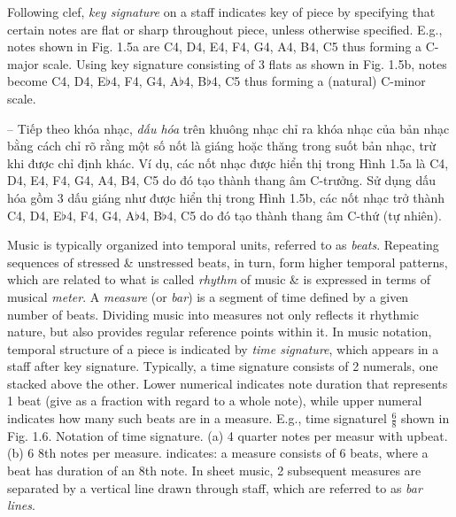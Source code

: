 \documentclass{article}
\begin{document}
\begin{itemize}
\begin{itemize}
\begin{itemize}
			Following clef, {\it key signature} on a staff indicates key of piece by specifying that certain notes are flat or sharp throughout piece, unless otherwise specified. E.g., notes shown in {\sf Fig. 1.5a} are C4, D4, E4, F4, G4, A4, B4, C5 thus forming a C-major scale. Using key signature consisting of 3 flats as shown in {\sf Fig. 1.5b}, notes become C4, D4, E$\flat$4, F4, G4, A$\flat$4, B$\flat$4, C5 thus forming a (natural) C-minor scale.
			
			-- Tiếp theo khóa nhạc, {\it dấu hóa} trên khuông nhạc chỉ ra khóa nhạc của bản nhạc bằng cách chỉ rõ rằng một số nốt là giáng hoặc thăng trong suốt bản nhạc, trừ khi được chỉ định khác. Ví dụ, các nốt nhạc được hiển thị trong {\sf Hình 1.5a} là C4, D4, E4, F4, G4, A4, B4, C5 do đó tạo thành thang âm C-trưởng. Sử dụng dấu hóa gồm 3 dấu giáng như được hiển thị trong {\sf Hình 1.5b}, các nốt nhạc trở thành C4, D4, E$\flat$4, F4, G4, A$\flat$4, B$\flat$4, C5 do đó tạo thành thang âm C-thứ (tự nhiên).
			
			Music is typically organized into temporal units, referred to as {\it beats}. Repeating sequences of stressed \& unstressed beats, in turn, form higher temporal patterns, which are related to what is called {\it rhythm} of music \& is expressed in terms of musical {\it meter}. A {\it measure} (or {\it bar}) is a segment of time defined by a given number of beats. Dividing music into measures not only reflects it rhythmic nature, but also provides regular reference points within it. In music notation, temporal structure of a piece is indicated by {\it time signature}, which appears in a staff after key signature. Typically, a time signature consists of 2 numerals, one stacked above the other. Lower numerical indicates note duration that represents 1 beat (give as a fraction with regard to a whole note), while upper numeral indicates how many such beats are in a measure. E.g., time signaturel $\frac{6}{8}$ shown in {\sf Fig. 1.6. Notation of time signature. (a) 4 quarter notes per measur with upbeat. (b) 6 8th notes per measure.} indicates: a measure consists of 6 beats, where a beat has duration of an 8th note. In sheet music, 2 subsequent measures are separated by a vertical line drawn through staff, which are referred to as {\it bar lines}.
			

\end{itemize}
\end{itemize}
\end{itemize}
\end{document}
